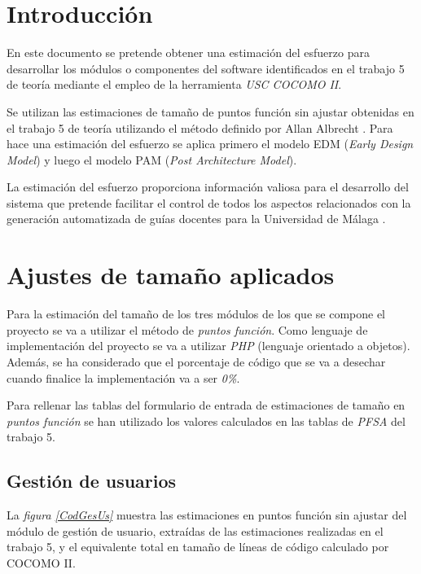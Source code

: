 \documentclass[11pt,a4paper,spanish,twoside]{report}
\begin{document}
\tableofcontents

\chapter*{Introducción}
En este documento se pretende obtener una estimación del esfuerzo para
desarrollar los módulos o componentes del software identificados en el trabajo
5 de teoría mediante el empleo de la herramienta \emph{USC COCOMO
  II}\cite{cocomo}.  

Se utilizan las estimaciones de tamaño de puntos función sin ajustar obtenidas
en el trabajo 5 de teoría utilizando el método definido por Allan Albrecht
\cite{albrecht}. Para hace una estimación del esfuerzo se aplica
primero el modelo EDM (\emph{Early Design Model}) y luego el modelo PAM
(\emph{Post Architecture Model}).  

La estimación del esfuerzo proporciona información valiosa para el desarrollo
del sistema que pretende facilitar el control de todos los aspectos
relacionados con la generación automatizada de guías docentes para la
Universidad de Málaga \cite{uma}.

\chapter{Ajustes de tamaño aplicados}
Para la estimación del tamaño de los tres módulos de los que se compone el
proyecto se va a utilizar el método de \emph{puntos función}. Como lenguaje
de implementación del proyecto se va a utilizar \emph{PHP} (lenguaje
orientado a objetos). Además, se ha considerado que el porcentaje de código que
se va a desechar cuando finalice la implementación va a ser \emph{0\%}.

Para rellenar las tablas del formulario de entrada de estimaciones de tamaño
en \emph{puntos función} se han utilizado los valores calculados en las tablas
de \emph{PFSA} del trabajo 5.

\section{Gestión de usuarios}
La \emph{figura \ref{CodGesUs}} muestra las estimaciones en puntos función sin
ajustar del módulo de gestión de usuario, extraídas de las estimaciones
realizadas en el trabajo 5, y el equivalente total en tamaño de líneas de
código calculado por COCOMO II.
\end{document}
